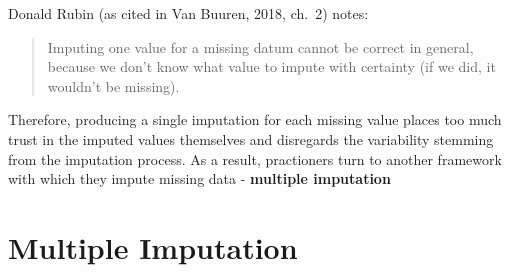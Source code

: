 \documentclass[12pt,oneside]{chicagocapstone}
\begin{document}
Donald Rubin (as cited in Van Buuren, 2018, ch.~2) notes:
\begin{quote}
Imputing one value for a missing datum cannot be correct in general,
because we don't know what value to impute with certainty (if we did, it
wouldn't be missing).
\end{quote}
Therefore, producing a single imputation for each missing value places
too much trust in the imputed values themselves and disregards the
variability stemming from the imputation process. As a result,
practioners turn to another framework with which they impute missing
data - \textbf{multiple imputation}

\section*{Multiple Imputation}\label{background-multiple-imputation}
\end{document}
